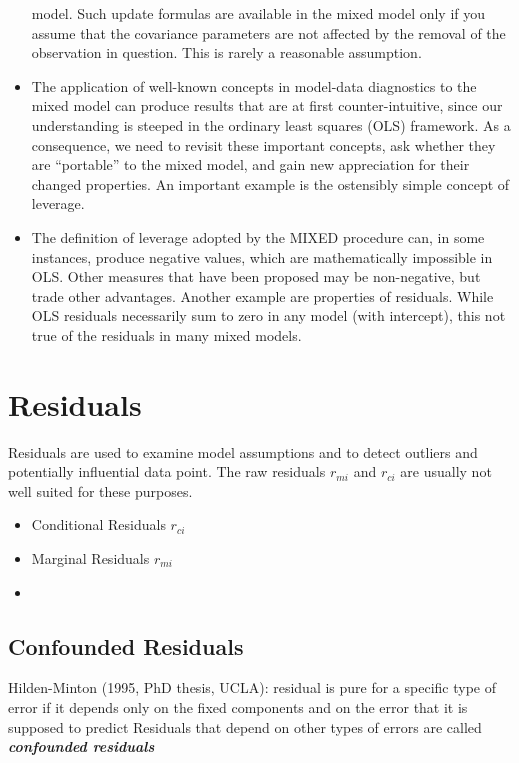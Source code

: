 \documentclass[Main.tex]{subfiles}
\begin{document}
\begin{itemize}
	model. Such update formulas are available in the mixed model only if you assume that the covariance
	parameters are not affected by the removal of the observation in question. This is rarely a reasonable
	assumption.
	\item The application of well-known concepts in model-data diagnostics to the mixed model can produce results
	that are at first counter-intuitive, since our understanding is steeped in the ordinary least squares
	(OLS) framework. As a consequence, we need to revisit these important concepts, ask whether they
	are “portable” to the mixed model, and gain new appreciation for their changed properties. An important
	example is the ostensibly simple concept of leverage. 
	\item The definition of leverage adopted by
	the MIXED procedure can, in some instances, produce negative values, which are mathematically
	impossible in OLS. Other measures that have been proposed may be non-negative, but trade other
	advantages. Another example are properties of residuals. While OLS residuals necessarily sum to
	zero in any model (with intercept), this not true of the residuals in many mixed models.
\end{itemize}







\section*{Residuals}

Residuals are used to examine model assumptions and to detect outliers and potentially influential data
point. The raw residuals $r_{mi}$ and $r_{ci}$ are usually not well suited for these purposes.

\begin{itemize}
	\item Conditional Residuals $r_{ci}$
	\item Marginal Residuals $r_{mi}$
	\item 
\end{itemize}







\subsection{Confounded Residuals}
Hilden-Minton (1995, PhD thesis, UCLA): residual is pure for a
specific type of error if it depends only on the fixed components and
on the error that it is supposed to predict
Residuals that depend on other types of errors are called \textit{\textbf{confounded
		residuals}}
\end{document}
